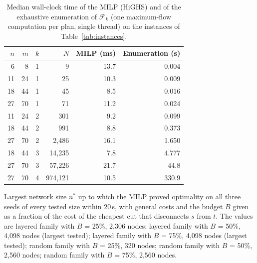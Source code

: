 \begin{table}[t]
\centering
\caption{Median wall-clock time of the MILP (HiGHS) and of the exhaustive enumeration of $\mathcal{F}_k$ (one maximum-flow computation per plan, single thread) on the instances of Table~\ref{tab:instances}.}\label{tab:classical}
\small
\begin{tabular}{rrrrrr}
\toprule
$n$ & $m$ & $k$ & $N$ & MILP (ms) & Enumeration (s) \\
\midrule
6 & 8 & 1 & 9 & 13.7 & 0.004 \\
11 & 24 & 1 & 25 & 10.3 & 0.009 \\
18 & 44 & 1 & 45 & 8.5 & 0.016 \\
27 & 70 & 1 & 71 & 11.2 & 0.024 \\
11 & 24 & 2 & 301 & 9.2 & 0.099 \\
18 & 44 & 2 & 991 & 8.8 & 0.373 \\
27 & 70 & 2 & 2{,}486 & 16.1 & 1.650 \\
18 & 44 & 3 & 14{,}235 & 7.8 & 4.777 \\
27 & 70 & 3 & 57{,}226 & 21.7 & 44.8 \\
27 & 70 & 4 & 974{,}121 & 10.5 & 330.9 \\
\bottomrule
\end{tabular}
\par\smallskip\parbox{0.95\linewidth}{\footnotesize Largest network size $n^{*}$ up to which the MILP proved optimality on all three seeds of every tested size within 20\,s, with general costs and the budget $B$ given as a fraction of the cost of the cheapest cut that disconnects $s$ from $t$. The values are layered family with $B$ = 25\%, 2{,}306 nodes; layered family with $B$ = 50\%, 4{,}098 nodes (largest tested); layered family with $B$ = 75\%, 4{,}098 nodes (largest tested); random family with $B$ = 25\%, 320 nodes; random family with $B$ = 50\%, 2{,}560 nodes; random family with $B$ = 75\%, 2{,}560 nodes.}
\end{table}
